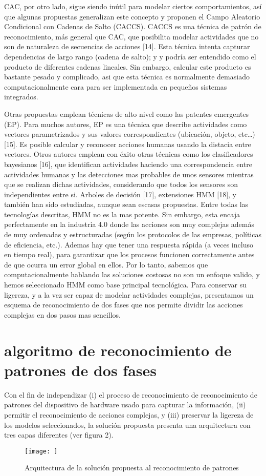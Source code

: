 \documentclass[a4paper]{article}
\begin{document}
\begin{center}
    
CAC, por otro lado, sigue siendo inútil para modelar ciertos comportamientos, así que algunas propuestas generalizan este concepto y proponen el Campo Aleatorio Condicional con Cadenas de Salto
(CACCS). CACCS es una técnica de patrón de reconocimiento, más general que CAC, que posibilita modelar actividades que no son de naturaleza de secuencias de acciones [14]. Esta técnica intenta capturar dependencias de largo rango (cadena de salto); y y podría ser entendido como el producto de diferentes cadenas lineales. Sin embargo, calcular este producto es bastante pesado y complicado, asi que esta técnica es normalmente demasiado computacionalmente cara para ser implementada en pequeños sistemas integrados.
\end{center}

Otras propuestas emplean técnicas de alto nivel como las patentes emergentes (EP). Para muchos autores, EP es una técnica que describe actividades como vectores parametrizados y sus valores correspondientes (ubicación, objeto, etc…) [15]. Es posible calcular y reconocer acciones humanas usando la distacia entre vectores. Otros autores emplean con éxito otras técnicas como los clasificadores bayesianos [16], que identifican actividades haciendo una correspondencia entre actividades humanas y las detecciones mas probables de unos sensores mientras que se realizan dichas actividades, considerando que todos los sensores son independientes entre si. Arboles de decisión [17], extensiones HMM [18], y también han sido estudiadas, aunque sean escasas propuestas. 
Entre todas las tecnologías descritas, HMM no es la mas potente. Sin embargo, esta encaja perfectamente en la industria 4.0 donde las acciones son muy complejas además de muy ordenadas y estructuradas (según los protocolos de las empresas, políticas de eficiencia, etc.). Ademas hay que tener una respuesta rápida (a veces incluso en tiempo real), para garantizar que los procesos funcionen correctamente antes de que ocurra un error global en ellos. Por lo tanto, sabemos que computacionalmente hablando las soluciones costosas no son un enfoque valido, y hemos seleccionado HMM como base principal tecnológica. Para conservar su ligereza, y a la vez ser capaz de modelar actividades complejas, presentamos un esquema de reconocimiento de dos fases que nos permite dividir las acciones complejas en dos pasos mas sencillos.
\section{algoritmo de reconocimiento de patrones de dos fases}
Con el fin de independizar (i) el proceso de reconocimiento de reconocimiento de patrones del dispositivo de hardware usado para capturar la información, (ii) permitir el reconocimiento de acciones complejas, y (iii) preservar la ligereza de los modelos seleccionados, la solución propuesta presenta una arquitectura con tres capas diferentes (ver figura 2).
\begin{figure}
    \centering
    \texttt{[image: ]}
    \caption{Arquitectura de la solución propuesta al reconocimiento de patrones}
    \label{fig:my_label}
\end{figure}
\end{document}
